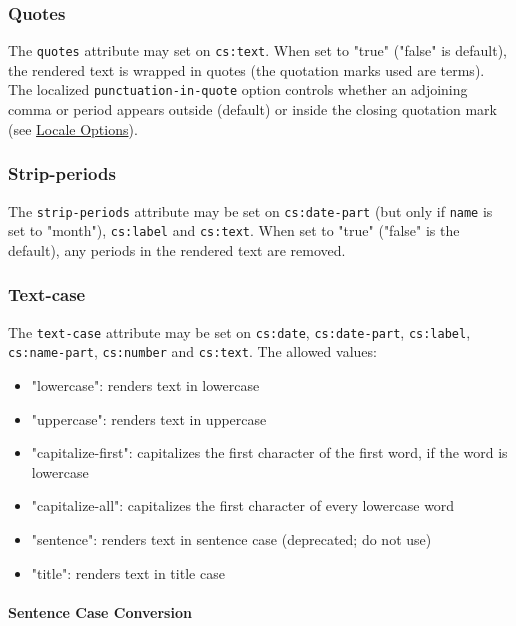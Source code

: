 \hypertarget{quotes}{%
\subsubsection{Quotes}\label{quotes}}

The \texttt{quotes} attribute may set on \texttt{cs:text}. When set to
"true" ("false" is default), the rendered text is wrapped in quotes (the
quotation marks used are terms). The localized
\texttt{punctuation-in-quote} option controls whether an adjoining comma
or period appears outside (default) or inside the closing quotation mark
(see \protect\hyperlink{locale-options}{Locale Options}).

\hypertarget{strip-periods}{%
\subsubsection{Strip-periods}\label{strip-periods}}

The \texttt{strip-periods} attribute may be set on \texttt{cs:date-part}
(but only if \texttt{name} is set to "month"), \texttt{cs:label} and
\texttt{cs:text}. When set to "true" ("false" is the default), any
periods in the rendered text are removed.

\hypertarget{text-case}{%
\subsubsection{Text-case}\label{text-case}}

The \texttt{text-case} attribute may be set on \texttt{cs:date},
\texttt{cs:date-part}, \texttt{cs:label}, \texttt{cs:name-part},
\texttt{cs:number} and \texttt{cs:text}. The allowed values:

\begin{itemize}
\tightlist
\item
  "lowercase": renders text in lowercase
\item
  "uppercase": renders text in uppercase
\item
  "capitalize-first": capitalizes the first character of the first word,
  if the word is lowercase
\item
  "capitalize-all": capitalizes the first character of every lowercase
  word
\item
  "sentence": renders text in sentence case (deprecated; do not use)
\item
  "title": renders text in title case
\end{itemize}

\hypertarget{sentence-case-conversion}{%
\paragraph{Sentence Case Conversion}\label{sentence-case-conversion}}

